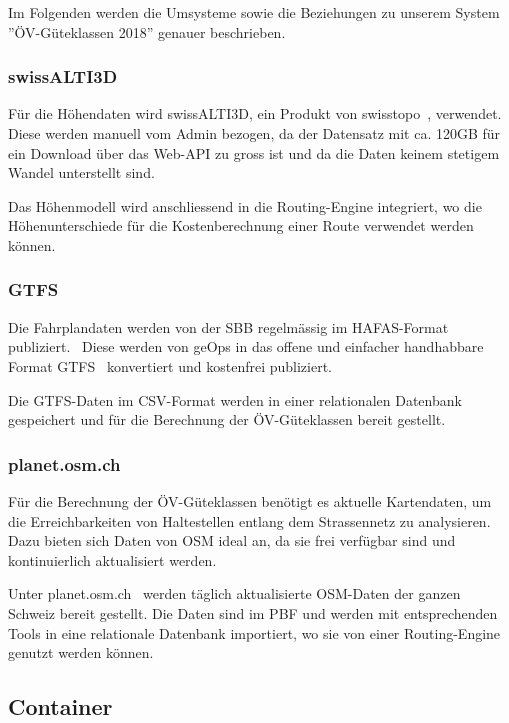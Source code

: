 Im Folgenden werden die Umsysteme sowie die Beziehungen zu unserem System ''ÖV-Güteklassen 2018'' genauer beschrieben.

\subsubsection{swissALTI3D}
\label{subsystem:swissALTI3D}

Für die Höhendaten wird swissALTI3D, ein Produkt von swisstopo~\cite{swissalti3d_swisstopo}, verwendet.
Diese werden manuell vom Admin bezogen, da der Datensatz mit ca. 120GB für ein Download über das Web-\ac{API} zu gross ist und da die Daten keinem stetigem Wandel unterstellt sind.

Das Höhenmodell wird anschliessend in die Routing-Engine integriert, wo die Höhenunterschiede für die Kostenberechnung einer Route verwendet werden können.

\subsubsection{GTFS}
\label{subsystem:GTFS}

Die Fahrplandaten werden von der SBB regelmässig im HAFAS-Format publiziert.~\cite{sbb_hafas_spec}
Diese werden von geOps in das offene und einfacher handhabbare Format \ac{GTFS}~\cite{gtfs_spec} konvertiert und kostenfrei publiziert.~\cite{geops_fahrplandaten}

Die \ac{GTFS}-Daten im CSV-Format werden in einer relationalen Datenbank gespeichert und für die Berechnung der ÖV-Güteklassen bereit gestellt.

\subsubsection{planet.osm.ch}
\label{subsystem:planet.osm.ch}

Für die Berechnung der ÖV-Güteklassen benötigt es aktuelle Kartendaten, um die Erreichbarkeiten von Haltestellen entlang dem Strassennetz zu analysieren.
Dazu bieten sich Daten von \ac{OSM} ideal an, da sie frei verfügbar sind und kontinuierlich aktualisiert werden.

Unter planet.osm.ch~\cite{planet_osm_ch} werden täglich aktualisierte \ac{OSM}-Daten der ganzen Schweiz bereit gestellt.
Die Daten sind im \ac{PBF} und werden mit entsprechenden Tools in eine relationale Datenbank importiert, wo sie von einer Routing-Engine genutzt werden können.


\subsection{Container}
\label{Architektur:Container}

